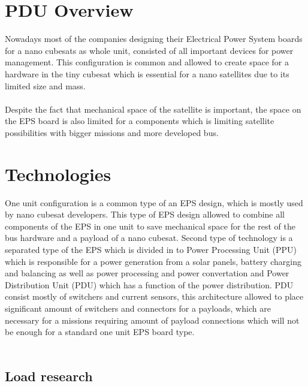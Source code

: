   
  
  
  
  
  
  
  
  

\section{PDU Overview \label{sec:tech}}
Nowadays most of the companies designing their Electrical Power System boards for a nano cubesats as whole unit, consisted of all important devices for power management. This configuration is common and allowed to create space for a hardware in the tiny cubesat which is essential for a nano satellites due to its limited size and mass. 
\\ \\ Despite the fact that mechanical space of the satellite is important, the space on the EPS board is also limited for a components which is limiting satellite possibilities with bigger missions and more developed bus.  

\section{Technologies \label{sec:tech}}

One unit configuration is a common type of an EPS design, which is mostly used by nano cubesat developers. This type of EPS design allowed to combine all components of the EPS in one unit to save mechanical space for the rest of the bus hardware and a payload of a nano cubesat. Second type of technology is a separated type of the EPS which is divided in to Power Processing Unit (PPU) which is responsible for a power generation from a solar panels, battery charging and balancing as well as power processing and power convertation and Power Distribution Unit (PDU) which has a function of the power distribution. PDU consist mostly of switchers and current sensors, this architecture allowed to place significant amount of switchers and connectors for a payloads, which are necessary for a missions requiring amount of payload connections which will not be enough for a standard one unit EPS board type. \\
\\


\subsection{Load research\label{sec:aaa}}

